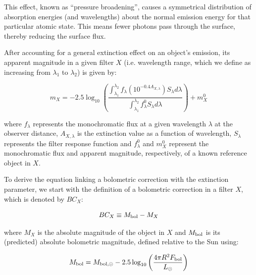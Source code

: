 \documentclass[12pt, a4paper]{report}
\begin{document}
This effect, known as ``pressure broadening'', causes a symmetrical distribution of absorption energies (and wavelengths) about the normal emission energy for that particular atomic state. This means fewer photons pass through the surface, thereby reducing the surface flux.

After accounting for a general extinction effect on an object's emission, its apparent magnitude in a given filter $X$ (i.e. wavelength range, which we define as increasing from $\lambda _{1}$ to $\lambda _{2}$) is given by:

\begin{equation}
m_{X} = -2.5 \log_{10} \left(\frac{ \int_{\lambda_{1}}^{\lambda_{2}} f_{\lambda} \left( 10^{-0.4 A_{X,\lambda}} \right) S_{\lambda} d\lambda }{ \int_{\lambda_{1}}^{\lambda_{2}} f_{\lambda}^{0} S_{\lambda} d\lambda }\right) + m_{X}^{0}
\label{app_mag_def}
\end{equation}

where $f_{\lambda}$ represents the monochromatic flux at a given wavelength $\lambda$ at the observer distance, $A_{X,\lambda}$ is the extinction value as a function of wavelength, $S_{\lambda}$ represents the filter response function and $f_{\lambda}^{0}$ and $m_{X}^{0}$ represent the monochromatic flux and apparent magnitude, respectively, of a known reference object in $X$.


To derive the equation linking a bolometric correction with the extinction parameter, we start with the definition of a bolometric correction in a filter $X$, which is denoted by $BC_{X}$:

\begin{equation}
BC_{X} \equiv M_{\textnormal{bol}} - M_{X}
\label{BC_def}
\end{equation}

where $M_{X}$ is the absolute magnitude of the object in $X$ and $M_{\textnormal{bol}}$ is its (predicted) absolute bolometric magnitude, defined relative to the Sun using:

\begin{equation}
M_{\textnormal{bol}} = M_{\textnormal{bol},\odot} - 2.5 \log_{10} \left( \frac{4\pi R^{2}F_{\textnormal{bol}}}{L_{\odot}} \right)
\label{mbol_sun}
\end{equation}
\end{document}
